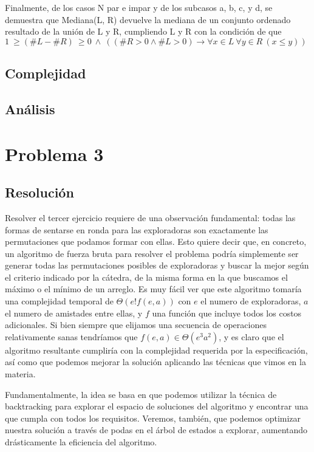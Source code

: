 \documentclass{article}
\theoremstyle{definition}
\theoremstyle{remark}
\begin{document}
Finalmente, de los casos N par e impar y de los subcasos a, b, c, y d, se demuestra que 
Mediana(L, R) devuelve la mediana de un conjunto ordenado resultado de la unión de L y R, cumpliendo L y R con la condición de que $1 \ \geq (\#L - \#R) \ \geq 0 \ \wedge \ ((\#R > 0 \wedge \#L >0) \rightarrow \forall x \in L \ \forall y \in R \ (x \leq y))$

\subsection{Complejidad}

\subsection{Análisis}

\section{Problema 3}

\subsection{Resolución}

Resolver el tercer ejercicio requiere de una observación fundamental: todas las formas de sentarse en ronda para las exploradoras son exactamente las permutaciones que podamos formar con ellas. Esto quiere decir que, en concreto, un algoritmo de fuerza bruta para resolver el problema podría simplemente ser generar todas las permutaciones posibles de exploradoras y buscar la mejor según el criterio indicado por la cátedra, de la misma forma en la que buscamos el máximo o el mínimo de un arreglo. Es muy fácil ver que este algoritmo tomaría una complejidad temporal de $\Theta(e! f(e, a))$ con $e$ el numero de exploradoras, $a$ el numero de amistades entre ellas, y $f$ una función que incluye todos los costos adicionales. Si bien siempre que elijamos una secuencia de operaciones relativamente sanas tendríamos que $f(e, a) \in \Theta(e^3 a^2)$, y es claro que el algoritmo resultante cumpliría con la complejidad requerida por la especificación, así como que podemos mejorar la solución aplicando las técnicas que vimos en la materia.

Fundamentalmente, la idea se basa en que podemos utilizar la técnica de backtracking para explorar el espacio de soluciones del algoritmo y encontrar una que cumpla con todos los requisitos. Veremos, también, que podemos optimizar nuestra solución a través de podas en el árbol de estados a explorar, aumentando drásticamente la eficiencia del algoritmo.
\end{document}
